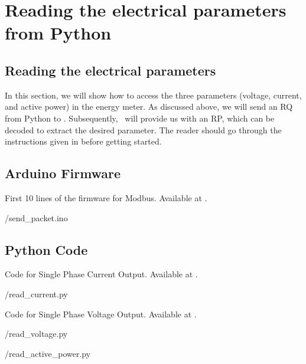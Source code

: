 \section{Reading the electrical parameters from Python}
\subsection{Reading the electrical parameters}
In this section, we will show how to access the three parameters (voltage, current, and active power) in the energy meter. As discussed above, we will send an RQ from Python to \arduino. Subsequently, \arduino\ will provide us with an RP, which can be decoded to extract the desired parameter. The reader should go through the instructions given in  before getting started. 

\subsection{Arduino Firmware}
\label{sec:firmware-modbus}
\begin{ardcode}
  {First 10 lines of the firmware for Modbus.  Available at
    .}
  \label{ard:firmware-modbus}
  
  {\LocMODardcode/send_packet.ino}
\end{ardcode}

\subsection{Python Code}
\label{sec:modbus-python-code}

\begin{pycode}
  {Code for Single Phase Current Output.
    Available at .}
  \label{py:current-modbus}
  
  {\LocMODpycode/read_current.py}
\end{pycode}

\begin{pycode}
  {Code for Single Phase Voltage Output.
    Available at .}
  \label{py:voltage-modbus}
  
  {\LocMODpycode/read_voltage.py}
\end{pycode}

\begin{pycode}
  \label{py:modbus-power}
  
  {\LocMODpycode/read_active_power.py}
\end{pycode}

